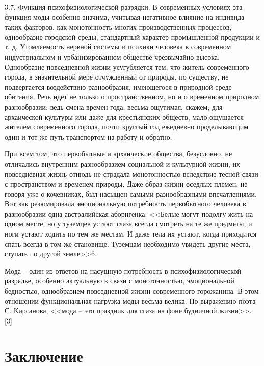   3.7. Функция психофизиологической разрядки. В современных условиях эта функция
  моды особенно значима, учитывая негативное влияние на индивида таких факторов,
  как монотонность многих производственных процессов, однообразие городской
  среды, стандартный характер промышленной продукции и т. д. Утомляемость
  нервной системы и психики человека в современном индустриальном и
  урбанизированном обществе чрезвычайно высока. Однообразие повседневной жизни
  усугубляется тем, что житель современного города, в значительной мере
  отчужденный от природы, по существу, не подвергается воздействию разнообразия,
  имеющегося в природной среде обитания. Речь идет не только о пространственном,
  но и о временном природном разнообразии: ведь смена времен года, весьма
  ощутимая, скажем, для архаической культуры или даже для крестьянских обществ,
  мало ощущается жителем современного города, почти круглый год ежедневно
  проделывающим один и тот же путь транспортом на работу и обратно.
  
  При всем том, что первобытные и архаические общества, безусловно, не
  отличались внутренним разнообразием социальной и культурной жизни, их
  повседневная жизнь отнюдь не страдала монотонностью вследствие тесной связи с
  пространством и временем природы. Даже образ жизни оседлых племен, не говоря
  уже о кочевниках, был насыщен самыми разнообразными впечатлениями. Вот как
  резюмировала эмоциональную потребность первобытного человека в разнообразии
  одна австралийская аборигенка: <<Белые могут подолгу жить на одном месте, но у
  туземцев устают глаза всегда смотреть на те же предметы, и ноги устают ходить
  по тем же местам. И даже тела их устают, когда приходится спать всегда в том
  же становище. Туземцам необходимо увидеть другие места, ступать по другой
  земле>>6.
  
  Мода – один из ответов на насущную потребность в психофизиологической
  разрядке, особенно актуальную в связи с монотонностью, эмоциональной
  бедностью, однообразием повседневной жизни современного горожанина. В этом
  отношении функциональная нагрузка моды весьма велика. По выражению поэта С.
  Кирсанова, <<мода – это праздник для глаза на фоне будничной жизни>>. [3]
  

  \section*{Заключение}

